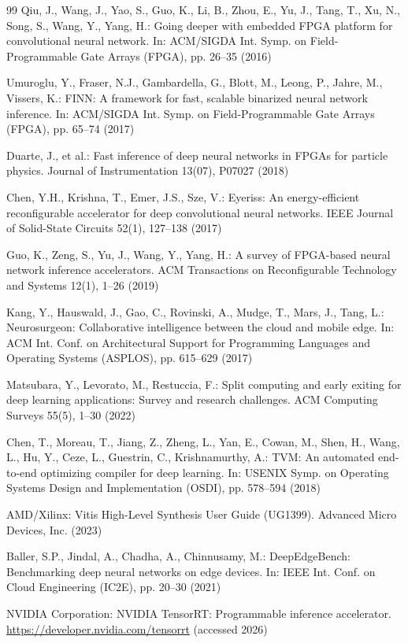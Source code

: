 \documentclass[runningheads]{llncs}
\begin{document}
\begin{thebibliography}{99}
 Qiu, J., Wang, J., Yao, S., Guo, K., Li, B., Zhou, E., Yu, J., Tang, T., Xu, N., Song, S., Wang, Y., Yang, H.: Going deeper with embedded FPGA platform for convolutional neural network. In: ACM/SIGDA Int. Symp. on Field-Programmable Gate Arrays (FPGA), pp. 26--35 (2016)

 Umuroglu, Y., Fraser, N.J., Gambardella, G., Blott, M., Leong, P., Jahre, M., Vissers, K.: FINN: A framework for fast, scalable binarized neural network inference. In: ACM/SIGDA Int. Symp. on Field-Programmable Gate Arrays (FPGA), pp. 65--74 (2017)

 Duarte, J., et al.: Fast inference of deep neural networks in FPGAs for particle physics. Journal of Instrumentation 13(07), P07027 (2018)

 Chen, Y.H., Krishna, T., Emer, J.S., Sze, V.: Eyeriss: An energy-efficient reconfigurable accelerator for deep convolutional neural networks. IEEE Journal of Solid-State Circuits 52(1), 127--138 (2017)

 Guo, K., Zeng, S., Yu, J., Wang, Y., Yang, H.: A survey of FPGA-based neural network inference accelerators. ACM Transactions on Reconfigurable Technology and Systems 12(1), 1--26 (2019)

 Kang, Y., Hauswald, J., Gao, C., Rovinski, A., Mudge, T., Mars, J., Tang, L.: Neurosurgeon: Collaborative intelligence between the cloud and mobile edge. In: ACM Int. Conf. on Architectural Support for Programming Languages and Operating Systems (ASPLOS), pp. 615--629 (2017)

 Matsubara, Y., Levorato, M., Restuccia, F.: Split computing and early exiting for deep learning applications: Survey and research challenges. ACM Computing Surveys 55(5), 1--30 (2022)

 Chen, T., Moreau, T., Jiang, Z., Zheng, L., Yan, E., Cowan, M., Shen, H., Wang, L., Hu, Y., Ceze, L., Guestrin, C., Krishnamurthy, A.: TVM: An automated end-to-end optimizing compiler for deep learning. In: USENIX Symp. on Operating Systems Design and Implementation (OSDI), pp. 578--594 (2018)

 AMD/Xilinx: Vitis High-Level Synthesis User Guide (UG1399). Advanced Micro Devices, Inc. (2023)

 Baller, S.P., Jindal, A., Chadha, A., Chinnusamy, M.: DeepEdgeBench: Benchmarking deep neural networks on edge devices. In: IEEE Int. Conf. on Cloud Engineering (IC2E), pp. 20--30 (2021)

 NVIDIA Corporation: NVIDIA TensorRT: Programmable inference accelerator. \url{https://developer.nvidia.com/tensorrt} (accessed 2026)

\end{thebibliography}
\end{document}
